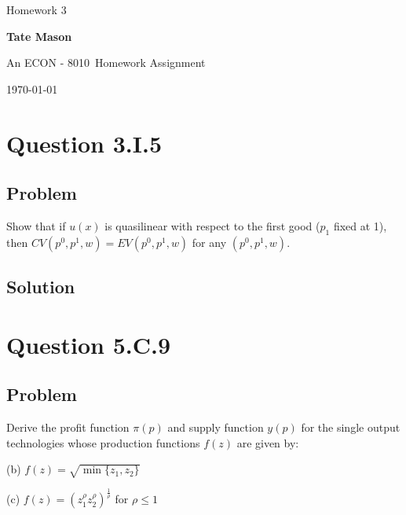 \documentclass[10pt, a4paper]{article}
\newcommand\course{ECON - 8010}                            %
\newcommand\hwnumber{ 3}                                 %
\newcommand\Information{Tate Mason}                        %
\begin{document}
  \begin{titlepage}
    \begin{center}
      \vspace*{3cm}
            
        \vspace{1cm}
        \huge
        Homework \hwnumber
            
        \vspace{1.5cm}
        \Large
            
        \textbf{\Information}                      %
            
        \vfill
        
        An \course \ Homework Assignment
            
        \vspace{1cm}
        \Large

        
        \today
            
    \end{center}
  \end{titlepage}

  \newpage

  \section{Question 3.I.5}
    \subsection{Problem}
      Show that if $u(x)$ is quasilinear with respect to the first good ($p_1$ fixed at 1), then $CV(p^0,p^1,w)=EV(p^0,p^1,w)$ for any $(p^0,p^1,w)$.
    \subsection{Solution}
  \section{Question 5.C.9}
    \subsection{Problem}
      Derive the profit function $\pi(p)$ and supply function $y(p)$ for the single output technologies whose production functions $f(z)$ are given by:

      (b) $f(z)=\sqrt{\min\{z_1,z_2\}}$

      (c) $f(z)=(z_1^{\rho}z_2^{\rho})^{\frac{1}{\rho}}$ for $\rho\leq1$ 
\end{document}
